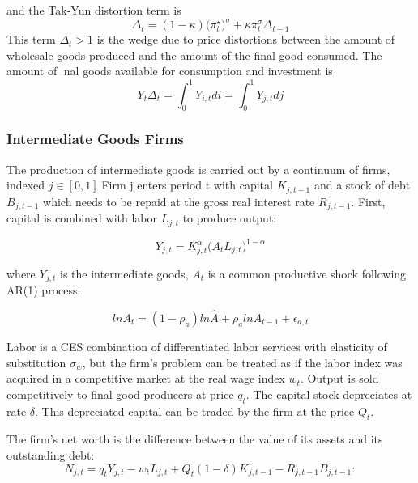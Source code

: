 \documentclass[10pt,math=newtx,citestyle=gb7714-2015,bibstyle=gb7714-2015]{elegantbook}
\begin{document}
{{{			and the Tak-Yun distortion term is
			\begin{equation}
				\Delta_t=(1-\kappa)\bigg(\pi_t^\star\bigg)^{\sigma}+\kappa \pi_t^\sigma \Delta_{t-1}
			\end{equation}
			This term $\Delta_t>1$ is the wedge due to price distortions between the amount of wholesale goods produced and the amount of the final good consumed. The amount of nal goods available for consumption and investment is
			\begin{equation}
				Y_t\Delta_t=\int_{0}^{1}Y_{i,t}di=\int_{0}^{1}Y_{j,t}dj
			\end{equation}
			
			
			\subsubsection{Intermediate Goods Firms}
			
			The production of intermediate goods is carried out by a continuum of firms, indexed $j \in [0, 1]$.Firm j enters period t with capital $K_{j,t-1}$ and a stock of debt $B_{j,t-1}$ which needs to be repaid at the gross real interest rate $R_{j,t-1}$. First, capital is combined with labor $L_{j,t}$ to produce output:
			
			\begin{equation}
				Y_{j,t}=K_{j,t}^{\alpha}\bigg(A_tL_{j,t}\bigg)^{1-\alpha}
			\end{equation}
			
			where $Y_{j,t}$ is the intermediate goods, $A_t$ is a common productive shock following AR(1) process:
			
			\begin{equation}
				lnA_t=(1-\rho_a)ln\hat{A}+\rho_a lnA_{t-1}+\epsilon_{a,t}
			\end{equation}
			
			Labor is a CES combination of differentiated labor services with elasticity of substitution $\sigma_w$, but the firm's problem can be treated as if the labor index was acquired in a competitive market at the real wage index $w_t$. Output is sold competitively to final good producers at price $q_t$. The capital stock depreciates at rate $\delta$. This depreciated capital can be traded by the firm at the price $Q_t$.
			
			The firm's net worth is the difference between the value of its assets and its outstanding debt:
			\begin{equation}
				N_{j,t} = q_tY_{j,t}-w_tL_{j,t} + Q_t (1 -\delta)K_{j,t-1} -R_{j,t-1}B_{j,t-1}:
			\end{equation}
			
}}}
\end{document}
